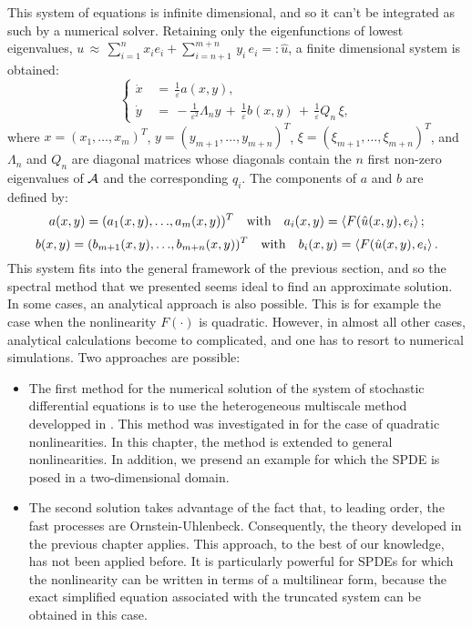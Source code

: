 This system of equations is infinite dimensional, and so it can't be integrated
as such by a numerical solver. Retaining only the eigenfunctions of lowest
eigenvalues, $u\,\approx\, \sum^{n}_{i=1}x_i e_i + \sum_{i=n+1}^{m+n}
\,y_{i}\,e_{i} =: \hat u$, a finite dimensional system is obtained:
\begin{equation*}
    \left\{\begin{aligned} 
            \dot x\,&=\,\frac 1 {\varepsilon}a(x, y) ,\\ \dot
            y\,&=\,-\frac 1 {\varepsilon^{2}} \Lambda_{n}  y\,+\,\frac 1 {\varepsilon}
            b(x,y)\,+\,\frac 1 \varepsilon Q_n\,{\xi}, 
        \end{aligned} \right.  
\end{equation*} 
where $x = (x_1, \dots, x_m)^{T}$, $y = (y_{m+1}, \dots, y_{m + n})^{T}$,
$\xi= (\xi_{m+1}, \dots, \xi_{m+n})^{T}$, and $\Lambda_{n}$ and $Q_{n}$
are diagonal matrices whose diagonals contain the $n$ first non-zero eigenvalues
of $\mathcal A$ and the corresponding $q_{i}$. The components of $a$ and $b$ are defined by: 
\begin{equation*} 
    a(x, y) = (a_{1}(x,y), {\dots},a_{m}(x,y))^{T} \quad \text{with} \quad a_{i}(x,y) = \left \langle F(\hat u(x,y),e_i \right\rangle;
\end{equation*} 
\begin{equation*} 
    b(x, y) = (b_{m+1}(x,y), {\dots},b_{m+n}(x,y))^{T} \quad \text{with} \quad b_{i}(x,y) = \left \langle F(\hat u(x,y),e_i \right\rangle.
\end{equation*} 
This system fits into the general framework of the previous section, and so the
spectral method that we presented seems ideal to find an approximate solution.
In some cases, an analytical approach is also possible. This is for example the case
when the nonlinearity $F({\cdot})$ is quadratic. However, in almost all other
cases, analytical calculations become to complicated, and one has to resort
to numerical simulations. Two approaches are possible:
\begin{itemize} 
    \item The first method for the numerical solution of the system
        of stochastic differential equations is to use the
        heterogeneous multiscale method developped in
        \cite{weinan2005analysis}.  This method was investigated in
        \cite{abdulle2012numerical} for the case of quadratic
        nonlinearities. In this chapter, the method is extended to
        general nonlinearities. In addition, we presend an example for
        which the SPDE is posed in a two-dimensional domain.
    \item The second solution takes advantage of the
        fact that, to leading order, the fast processes are
        Ornstein-Uhlenbeck. Consequently, the theory developed in the
        previous chapter applies. This approach, to the best of our
        knowledge, has not been applied before. It is particularly
        powerful for SPDEs for which the nonlinearity can be written in
        terms of a multilinear form, because the exact simplified equation
        associated with the truncated system can be obtained in this
        case. 
\end{itemize} 

